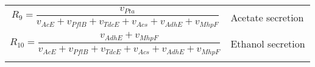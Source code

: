 \begin{table}
{\begin{tabular}{|m{15cm}|m{5cm}|}
        \[{R_9} = \frac{{{v_{Pta}}}}{{{v_{AcE}} + {v_{PflB}} + {v_{TdcE}} + {v_{Acs}} + {v_{AdhE}} + {v_{MhpF}}}}\]                                                                             & Acetate secretion                \\ 
        \[{R_{10}} = \frac{{{v_{AdhE}} + {v_{MhpF}}}}{{{v_{AcE}} + {v_{PflB}} + {v_{TdcE}} + {v_{Acs}} + {v_{AdhE}} + {v_{MhpF}}}}\]                                                            & Ethanol secretion                \\ 

        \hline  \normalsize
    \end{tabular}}
\normalsize
\end{table}





